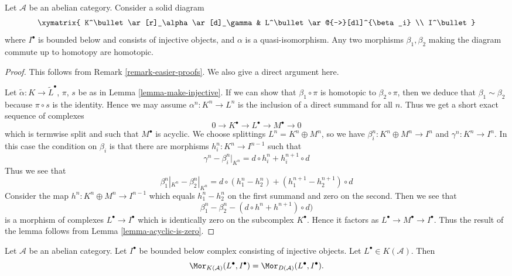 \begin{lemma}
\label{lemma-morphisms-equal-up-to-homotopy}
Let $\mathcal{A}$ be an abelian category.
Consider a solid diagram
$$
\xymatrix{
K^\bullet \ar[r]_\alpha \ar[d]_\gamma & L^\bullet \ar@{-->}[dl]^{\beta_i} \\
I^\bullet
}
$$
where $I^\bullet$ is bounded below and consists of injective
objects, and $\alpha$ is a quasi-isomorphism.
Any two morphisms $\beta_1, \beta_2$ making the diagram commute
up to homotopy are homotopic.
\end{lemma}

\begin{proof}
This follows from
Remark \ref{remark-easier-proofs}.
We also give a direct argument here.

\medskip\noindent
Let $\tilde \alpha : K \to \tilde L^\bullet$, $\pi$, $s$ be as in
Lemma \ref{lemma-make-injective}. If we can show that $\beta_1 \circ\pi$
is homotopic to $\beta_2 \circ \pi$, then we deduce that
$\beta_1 \sim \beta_2$ because $\pi \circ s$ is the identity.
Hence we may assume $\alpha^n : K^n \to L^n$ is the
inclusion of a direct summand for all $n$. Thus we get a
short exact sequence of complexes
$$
0 \to K^\bullet \to L^\bullet \to M^\bullet \to 0
$$
which is termwise split and such that $M^\bullet$ is acyclic.
We choose splittings $L^n = K^n \oplus M^n$, so we have
$\beta_i^n : K^n \oplus M^n \to I^n$ and $\gamma^n : K^n \to I^n$.
In this case the condition on $\beta_i$ is that there are morphisms
$h_i^n : K^n \to I^{n - 1}$ such that
$$
\gamma^n - \beta_i^n|_{K^n} = d \circ h_i^n + h_i^{n + 1} \circ d
$$
Thus we see that
$$
\beta_1^n|_{K^n} - \beta_2^n|_{K^n}
=
d \circ (h_1^n - h_2^n) + (h_1^{n + 1} - h_2^{n + 1}) \circ d
$$
Consider the map $h^n : K^n \oplus M^n \to I^{n - 1}$ which
equals $h_1^n - h_2^n$ on the first summand and zero on the second.
Then we see that
$$
\beta_1^n - \beta_2^n
-
(d \circ h^n + h^{n + 1}) \circ d)
$$
is a morphism of complexes $L^\bullet \to I^\bullet$
which is identically zero on the subcomplex $K^\bullet$.
Hence it factors as $L^\bullet \to M^\bullet \to I^\bullet$.
Thus the result of the lemma follows from Lemma \ref{lemma-acyclic-is-zero}.
\end{proof}

\begin{lemma}
\label{lemma-morphisms-into-injective-complex}
Let $\mathcal{A}$ be an abelian category.
Let $I^\bullet$ be bounded below complex consisting of injective
objects. Let $L^\bullet \in K(\mathcal{A})$. Then
$$
\Mor_{K(\mathcal{A})}(L^\bullet, I^\bullet)
=
\Mor_{D(\mathcal{A})}(L^\bullet, I^\bullet).
$$
\end{lemma}

